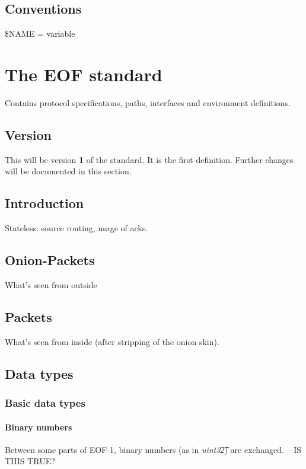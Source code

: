 \documentclass[12pt,a4paper]{book}
\begin{document}
\section{Conventions}
\$NAME = variable
\chapter{The EOF standard}
Contains protocol specifications, paths, interfaces and environment
definitions.
\section{Version}
This will be version \textbf{1} of the standard. It is the first definition.
Further changes will be documented in this section.
\section{Introduction}
Stateless: source routing, usage of acks.
\section{Onion-Packets}
What's seen from outside
\section{Packets}
What's seen from inside (after stripping of the onion skin).
\section{Data types}
\subsection{Basic data types}
\subsubsection{Binary numbers}
Between some parts of EOF-1, binary numbers (as in \textit{uint32\t})
are exchanged. -- IS THIS TRUE?
\end{document}
